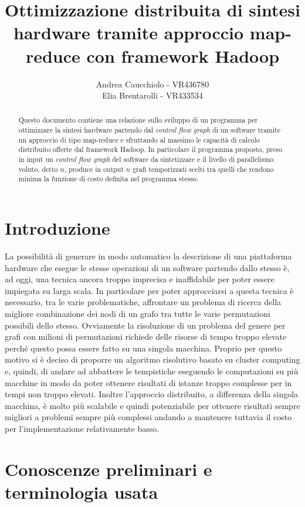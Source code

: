 \documentclass[]{IEEEtran}
\title{Ottimizzazione distribuita di sintesi hardware tramite approccio map-reduce con framework Hadoop}
\author{Andrea Caucchiolo - VR436780\\Elia Brentarolli - VR433534}
\begin{document}
\maketitle

\begin{abstract}
	
Questo documento contiene una relazione sullo sviluppo di un programma per ottimizzare la sintesi hardware partendo dal \emph{control flow graph} di un software tramite un  approccio di tipo map-reduce e sfruttando al massimo le capacità di calcolo distribuito offerte dal framework Hadoop. In particolare il programma proposto, preso in input un \emph{control flow graph} del software da sintetizzare e il livello di parallelismo voluto, detto $n$, produce in output $n$ grafi temporizzati scelti tra quelli che rendono minima la funzione di costo definita nel programma stesso.

\end{abstract}


\section{Introduzione}

La possibilità di generare in modo automatico la descrizione di una piattaforma hardware che esegue le stesse operazioni di un software partendo dallo stesso è, ad oggi, una tecnica ancora troppo imprecisa e inaffidabile per poter essere impiegata su larga scala. In particolare per poter approcciarsi a questa tecnica è necessario, tra le varie problematiche, affrontare un problema di ricerca della migliore combinazione dei nodi di un grafo tra tutte le varie permutazioni possibili dello stesso. Ovviamente la risoluzione di un problema del genere per grafi con milioni di permutazioni richiede delle risorse di tempo troppo elevate perché questo possa essere fatto su una singola macchina. Proprio per questo motivo si è deciso di proporre un algoritmo risolutivo basato su cluster computing e, quindi, di andare ad abbattere le tempistiche eseguendo le computazioni su più macchine in modo da poter ottenere risultati di istanze troppo complesse per in tempi non troppo elevati. Inoltre l'approccio distribuito, a differenza della singola macchina, è molto più scalabile e quindi potenziabile per ottenere risultati sempre migliori a problemi sempre più complessi andando a mantenere tuttavia il costo per l'implementazione relativamente basso.

\section{Conoscenze preliminari e terminologia usata}
\end{document}
